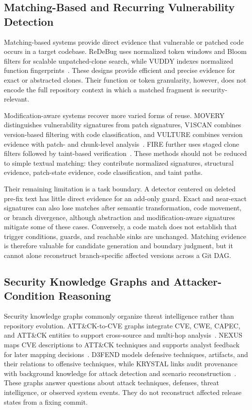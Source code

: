 \subsection{Matching-Based and Recurring Vulnerability Detection}

Matching-based systems provide direct evidence that vulnerable or patched code occurs in a target codebase. ReDeBug uses normalized token windows and Bloom filters for scalable unpatched-clone search, while VUDDY indexes normalized function fingerprints~\cite{redebug2012,vuddy2017}. These designs provide efficient and precise evidence for exact or abstracted clones. Their function or token granularity, however, does not encode the full repository context in which a matched fragment is security-relevant.

Modification-aware systems recover more varied forms of reuse. MOVERY distinguishes vulnerability signatures from patch signatures, V1SCAN combines version-based filtering with code classification, and VULTURE combines version evidence with patch- and chunk-level analysis~\cite{movery2022,v1scan2023,vulture2025}. FIRE further uses staged clone filters followed by taint-based verification~\cite{fire2024}. These methods should not be reduced to simple textual matching: they contribute normalized signatures, structural evidence, patch-state evidence, code classification, and taint paths.

Their remaining limitation is a task boundary. A detector centered on deleted pre-fix text has little direct evidence for an add-only guard. Exact and near-exact signatures can also lose matches after semantic transformation, code movement, or branch divergence, although abstraction and modification-aware signatures mitigate some of these cases. Conversely, a code match does not establish that trigger conditions, guards, and reachable sinks are unchanged. Matching evidence is therefore valuable for candidate generation and boundary judgment, but it cannot alone reconstruct branch-specific affected versions across a Git DAG.

\subsection{Security Knowledge Graphs and Attacker-Condition Reasoning}

Security knowledge graphs commonly organize threat intelligence rather than repository evolution. ATT\&CK-to-CVE graphs integrate CVE, CWE, CAPEC, and ATT\&CK entities to support cross-source and multi-hop analysis~\cite{attacktocve2025}. NEXUS maps CVE descriptions to ATT\&CK techniques and supports analyst feedback for later mapping decisions~\cite{nexus2026}. D3FEND models defensive techniques, artifacts, and their relations to offensive techniques, while KRYSTAL links audit provenance with background knowledge for attack detection and scenario reconstruction~\cite{d3fend2021,krystal2022}. These graphs answer questions about attack techniques, defenses, threat intelligence, or observed system events. They do not reconstruct affected release states from a fixing commit.

